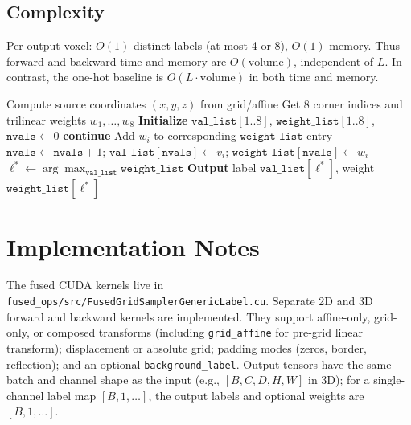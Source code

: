 \documentclass[11pt]{article}
\begin{document}
\subsection{Complexity}
Per output voxel: $O(1)$ distinct labels (at most 4 or 8), $O(1)$ memory. Thus forward and backward time and memory are $O(\text{volume})$, independent of $L$. In contrast, the one-hot baseline is $O(L \cdot \text{volume})$ in both time and memory.

\begin{algorithm}[t]
\caption{Per-output-voxel forward (3D).}
\label{alg:forward}
\begin{algorithmic}[1]
\State Compute source coordinates $(x,y,z)$ from grid/affine
\State Get 8 corner indices and trilinear weights $w_1,\ldots,w_8$
\State \textbf{Initialize} $\texttt{val\_list}[1..8]$, $\texttt{weight\_list}[1..8]$, $\texttt{nvals} \gets 0$
   \textbf{continue} \EndIf
    \State Add $w_i$ to corresponding $\texttt{weight\_list}$ entry
  \Else
    \State $\texttt{nvals} \gets \texttt{nvals}+1$; $\texttt{val\_list}[\texttt{nvals}] \gets v_i$; $\texttt{weight\_list}[\texttt{nvals}] \gets w_i$
  \EndIf
\EndFor
\State $\ell^* \gets \arg\max_{\texttt{val\_list}} \texttt{weight\_list}$
\State \textbf{Output} label $\texttt{val\_list}[\ell^*]$, weight $\texttt{weight\_list}[\ell^*]$
\end{algorithmic}
\end{algorithm}

\section{Implementation Notes}
\label{sec:impl}

The fused CUDA kernels live in \texttt{fused\_ops/src/FusedGridSamplerGenericLabel.cu}. Separate 2D and 3D forward and backward kernels are implemented. They support affine-only, grid-only, or composed transforms (including \texttt{grid\_affine} for pre-grid linear transform); displacement or absolute grid; padding modes (zeros, border, reflection); and an optional \texttt{background\_label}. Output tensors have the same batch and channel shape as the input (e.g., $[B, C, D, H, W]$ in 3D); for a single-channel label map $[B, 1, \ldots]$, the output labels and optional weights are $[B, 1, \ldots]$.
\end{document}
